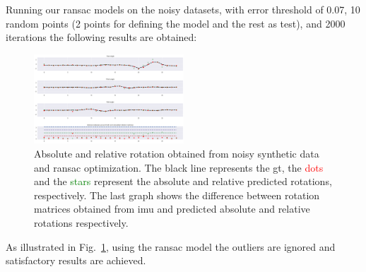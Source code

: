 Running our ransac models on the noisy datasets, with error threshold of 0.07,
10 random points (2 points for defining the model and the rest as test), and
2000 iterations the following results are obtained:
\begin{figure}
  \centering
  \includegraphics[width=0.5\textwidth]{./content/experiments/figures/noisy-ransac-abs-rel-2.png}
  \caption{Absolute and relative rotation obtained from  noisy synthetic data
    and ransac optimization. The black line represents the \gls{gt}, the
    \textcolor{red}{dots} and the \textcolor{green}{stars} represent the
    absolute and relative predicted rotations, respectively. The last graph
    shows the difference between rotation matrices obtained from \gls{imu} and
    predicted absolute and relative rotations respectively.}
  \label{fig:res-noisy-syn-ransac-abs-rel}
\end{figure}
As illustrated in Fig.~\ref{fig:res-noisy-syn-ransac-abs-rel}, using the ransac
model the outliers are ignored and satisfactory results are achieved.












